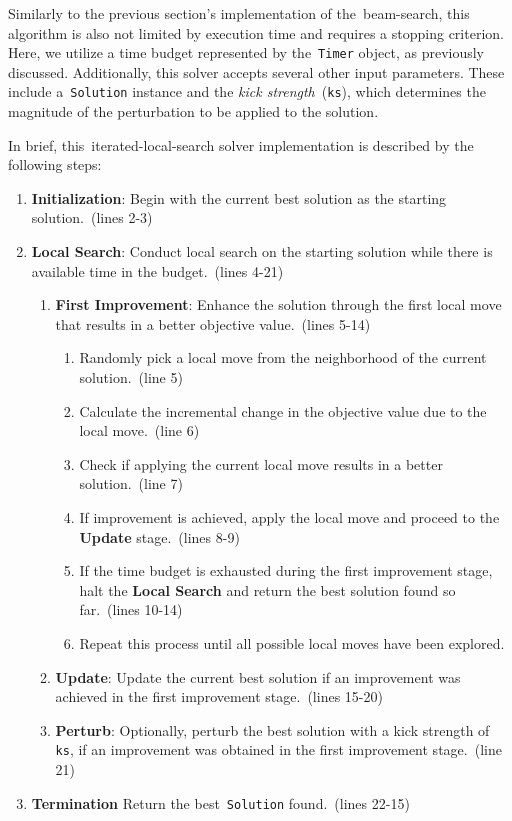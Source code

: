 Similarly to the previous section's implementation of the~\acrshort{beam-search},
this algorithm is also not limited by execution time and requires a stopping
criterion. Here, we utilize a time budget represented by the~\texttt{Timer}
object, as previously discussed. Additionally, this solver accepts several other
input parameters. These include a~\texttt{Solution} instance and the
\textit{kick strength}~(\texttt{ks}), which determines the magnitude of the
perturbation to be applied to the solution.



In brief, this~\acrshort{iterated-local-search} solver implementation is
described by the following steps:

\begin{enumerate}
  \item \textbf{Initialization}: Begin with the current best solution as the starting solution.~(lines 2-3)
  \item \textbf{Local Search}: Conduct local search on the starting solution
        while there is available time in the budget.~(lines 4-21)
        \begin{enumerate}
          \item \textbf{First Improvement}: Enhance the solution through the first local move that results in
                a better objective value.~(lines 5-14)
                \begin{enumerate}
                  \item Randomly pick a local move from the neighborhood of the current solution.~(line 5)
                  \item Calculate the incremental change in the objective value due to the local move.~(line 6)
                  \item Check if applying the current local move results in a better solution.~(line 7)
                  \item If improvement is achieved, apply the local move and proceed to the \textbf{Update} stage.~(lines 8-9)
                  \item If the time budget is exhausted during the first improvement stage, halt the \textbf{Local Search}
                        and return the best solution found so far.~(lines 10-14)
                  \item Repeat this process until all possible local moves have been explored.
                \end{enumerate}
          \item \textbf{Update}: Update the current best solution if an improvement was achieved
                in the first improvement stage.~(lines 15-20)
          \item \textbf{Perturb}: Optionally, perturb the best solution with a
                kick strength of \texttt{ks}, if an improvement was obtained in the
                first improvement stage.~(line 21)
        \end{enumerate}
  \item \textbf{Termination} Return the best~\texttt{Solution} found.~(lines 22-15)
\end{enumerate}

